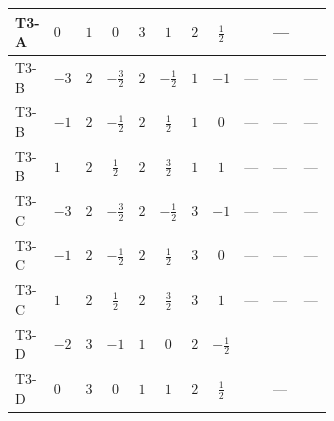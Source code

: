 \documentclass[8pt]{article}
\begin{document}
\begin{landscape}
\begin{longtable}{@{}llcccccc >{\raggedright\arraybackslash}p{0.21\linewidth} >{\raggedright\arraybackslash}p{0.21\linewidth} >{\raggedright\arraybackslash}p{0.21\linewidth}@{}}
\midrule
T3-A & $0$ & $1$ & $0$ & $3$ & $1$ & $2$ & $\frac{1}{2}$ & \scriptsize\adjustbox{max width=\linewidth}{$\begin{gathered} -\frac{9 {g_2}^2 {\lambda_{HS_1}^{(1)}}}{2}\end{gathered}$} & --- & \scriptsize\adjustbox{max width=\linewidth}{$\begin{gathered} -\frac{3 {g_1}^2 {\lambda_{HS_1}^{(1)}}}{2}\end{gathered}$} \\
\midrule
T3-B & $-3$ & $2$ & $-\frac{3}{2}$ & $2$ & $-\frac{1}{2}$ & $1$ & $-1$ & --- & --- & --- \\
\midrule
T3-B & $-1$ & $2$ & $-\frac{1}{2}$ & $2$ & $\frac{1}{2}$ & $1$ & $0$ & --- & --- & --- \\
\midrule
T3-B & $1$ & $2$ & $\frac{1}{2}$ & $2$ & $\frac{3}{2}$ & $1$ & $1$ & --- & --- & --- \\
\midrule
T3-C & $-3$ & $2$ & $-\frac{3}{2}$ & $2$ & $-\frac{1}{2}$ & $3$ & $-1$ & --- & --- & --- \\
\midrule
T3-C & $-1$ & $2$ & $-\frac{1}{2}$ & $2$ & $\frac{1}{2}$ & $3$ & $0$ & --- & --- & --- \\
\midrule
T3-C & $1$ & $2$ & $\frac{1}{2}$ & $2$ & $\frac{3}{2}$ & $3$ & $1$ & --- & --- & --- \\
\midrule
T3-D & $-2$ & $3$ & $-1$ & $1$ & $0$ & $2$ & $-\frac{1}{2}$ & \scriptsize\adjustbox{max width=\linewidth}{$\begin{gathered} -\frac{33 {g_2}^2 {\lambda_{HS_1}^{(1)}}}{2}\end{gathered}$} & \scriptsize\adjustbox{max width=\linewidth}{$\begin{gathered} +3 {g_1}^4\end{gathered}$} & \scriptsize\adjustbox{max width=\linewidth}{$\begin{gathered} -\frac{15 {g_1}^2 {\lambda_{HS_1}^{(1)}}}{2}\end{gathered}$} \\
\midrule
T3-D & $0$ & $3$ & $0$ & $1$ & $1$ & $2$ & $\frac{1}{2}$ & \scriptsize\adjustbox{max width=\linewidth}{$\begin{gathered} -\frac{33 {g_2}^2 {\lambda_{HS_1}^{(1)}}}{2}\end{gathered}$} & --- & \scriptsize\adjustbox{max width=\linewidth}{$\begin{gathered} -\frac{3 {g_1}^2 {\lambda_{HS_1}^{(1)}}}{2}\end{gathered}$} \\
\midrule

\end{longtable}
\end{landscape}
\end{document}
